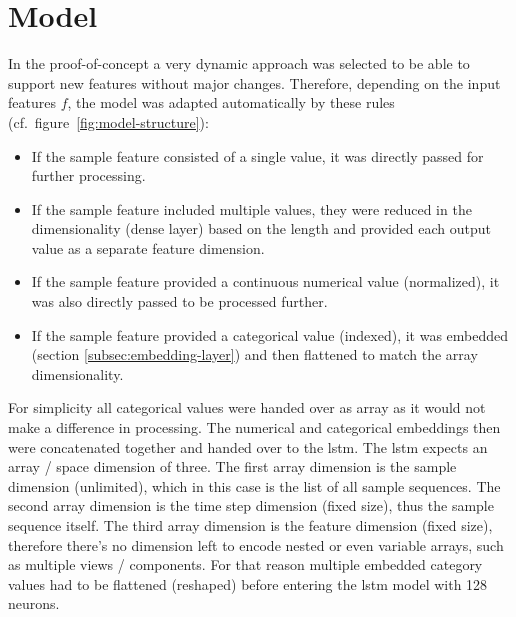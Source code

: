 %

\section{Model}

In the proof-of-concept a very dynamic approach was selected to be able to support new features without major changes.
Therefore, depending on the input features $f$, the model was adapted automatically by these rules (cf.\ figure~\ref{fig:model-structure}):

\begin{itemize}
  \item If the sample feature consisted of a single value, it was directly passed for further processing.
  \item If the sample feature included multiple values, they were reduced in the dimensionality (dense layer) based on the length and provided each output value as a separate feature dimension.
  \item If the sample feature provided a continuous numerical value (normalized), it was also directly passed to be processed further.
  \item If the sample feature provided a categorical value (indexed), it was embedded (section \ref{subsec:embedding-layer}) and then flattened to match the array dimensionality.
\end{itemize}

For simplicity all categorical values were handed over as array as it would not make a difference in processing.
The numerical and categorical embeddings then were concatenated together and handed over to the \gls{lstm}.
The \gls{lstm} expects an array / space dimension of three.
The first array dimension is the sample dimension (unlimited), which in this case is the list of all sample sequences.
The second array dimension is the time step dimension (fixed size), thus the sample sequence itself.
The third array dimension is the feature dimension (fixed size), therefore there's no dimension left to encode nested or even variable arrays, such as multiple views / components.
For that reason multiple embedded category values had to be flattened (reshaped) before entering the \gls{lstm} model with 128 neurons.

